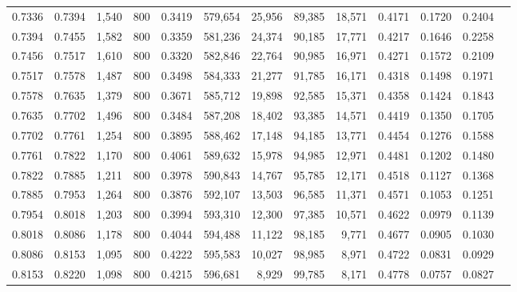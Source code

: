 \begin{tabular}{rrrrrrrrrrrrr}
0.7336 & 0.7394 &  1,540 & 800 &                                     0.3419 & 579,654 &  25,956 &  89,385 &  18,571 & 0.4171 & 0.1720 & 0.2404 \\
0.7394 & 0.7455 &  1,582 & 800 &                                     0.3359 & 581,236 &  24,374 &  90,185 &  17,771 & 0.4217 & 0.1646 & 0.2258 \\
0.7456 & 0.7517 &  1,610 & 800 &                                     0.3320 & 582,846 &  22,764 &  90,985 &  16,971 & 0.4271 & 0.1572 & 0.2109 \\
0.7517 & 0.7578 &  1,487 & 800 &                                     0.3498 & 584,333 &  21,277 &  91,785 &  16,171 & 0.4318 & 0.1498 & 0.1971 \\
0.7578 & 0.7635 &  1,379 & 800 &                                     0.3671 & 585,712 &  19,898 &  92,585 &  15,371 & 0.4358 & 0.1424 & 0.1843 \\
0.7635 & 0.7702 &  1,496 & 800 &                                     0.3484 & 587,208 &  18,402 &  93,385 &  14,571 & 0.4419 & 0.1350 & 0.1705 \\
0.7702 & 0.7761 &  1,254 & 800 &                                     0.3895 & 588,462 &  17,148 &  94,185 &  13,771 & 0.4454 & 0.1276 & 0.1588 \\
0.7761 & 0.7822 &  1,170 & 800 &                                     0.4061 & 589,632 &  15,978 &  94,985 &  12,971 & 0.4481 & 0.1202 & 0.1480 \\
0.7822 & 0.7885 &  1,211 & 800 &                                     0.3978 & 590,843 &  14,767 &  95,785 &  12,171 & 0.4518 & 0.1127 & 0.1368 \\
0.7885 & 0.7953 &  1,264 & 800 &                                     0.3876 & 592,107 &  13,503 &  96,585 &  11,371 & 0.4571 & 0.1053 & 0.1251 \\
0.7954 & 0.8018 &  1,203 & 800 &                                     0.3994 & 593,310 &  12,300 &  97,385 &  10,571 & 0.4622 & 0.0979 & 0.1139 \\
0.8018 & 0.8086 &  1,178 & 800 &                                     0.4044 & 594,488 &  11,122 &  98,185 &   9,771 & 0.4677 & 0.0905 & 0.1030 \\
0.8086 & 0.8153 &  1,095 & 800 &                                     0.4222 & 595,583 &  10,027 &  98,985 &   8,971 & 0.4722 & 0.0831 & 0.0929 \\
0.8153 & 0.8220 &  1,098 & 800 &                                     0.4215 & 596,681 &   8,929 &  99,785 &   8,171 & 0.4778 & 0.0757 & 0.0827 \\

\end{tabular}
